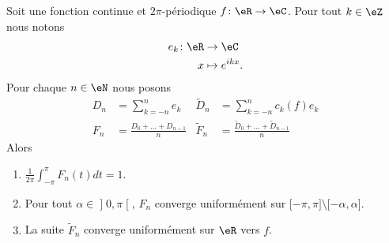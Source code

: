 \begin{theorem}[Fejèr]
    Soit une fonction continue et \( 2\pi\)-périodique \( f\colon \eR\to \eC\). Pour tout \( k\in \eZ\) nous notons
    \begin{equation}
        \begin{aligned}
            e_k\colon \eR&\to \eC \\
            x&\mapsto  e^{ikx}. 
        \end{aligned}
    \end{equation}
    Pour chaque \( n\in \eN\) nous posons
    \begin{subequations}
        \begin{align}
            D_n&=\sum_{k=-n}^ne_k& \tilde D_n&=\sum_{k=-n}^nc_k(f)e_k\\
            F_n&=\frac{  D_0+\ldots + D_{n-1} }{ n }&  \tilde F_n&=\frac{ \tilde D_0+\ldots +\tilde D_{n-1} }{ n }
        \end{align}
    \end{subequations}
    Alors
    \begin{enumerate}
        \item
            $\frac{1}{ 2\pi }\int_{-\pi}^{\pi}F_n(t)dt=1$.
        \item
            Pour tout \( \alpha\in \mathopen] 0 , \pi \mathclose[\), \( F_n\) converge uniformément sur \( \mathopen[ -\pi , \pi \mathclose]\setminus\mathopen[ -\alpha , \alpha \mathclose]\).
        \item
            La suite \( \tilde F_n \) converge uniformément sur \( \eR\) vers \( f\).
    \end{enumerate}
\end{theorem}

